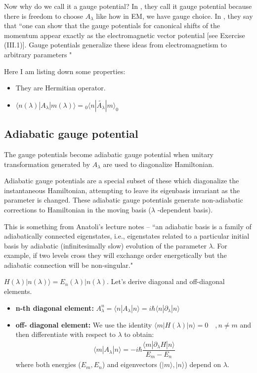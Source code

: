 \documentclass[11pt,a4paper]{article}
\begin{document}
Now why do we call it a gauge potential? In \cite{kolodrubetz2016geometry}, they call it gauge potential because there is freedom to choose $ A_{\lambda}$ like how in EM, we have gauge choice. In \cite{kolodrubetz2016geometry}, they say that
``one can show that the gauge potentials for canonical shifts of the momentum appear exactly as the electromagnetic vector potential [see Exercise (III.1)]. Gauge potentials generalize these ideas from electromagnetism to arbitrary parameters "

 Here I am listing down some properties:
\begin{itemize}
\item They are Hermitian operator.\
\item $\langle n (\lambda)| A_{\lambda}| m(\lambda) \rangle = {}_0\langle  n| \tilde{A_{\lambda}}| m \rangle_0$
\end{itemize}
 

\subsection{Adiabatic gauge potential}
The gauge potentials become adiabatic gauge potential when unitary transformation generated by $A_{\lambda}$ are used to diagonalize Hamiltonian.

 Adiabatic gauge potentials are a special subset of these which diagonalize  the instantaneous Hamiltonian, attempting to leave its eigenbasis invariant as the parameter is changed. These adiabatic gauge potentials generate non-adiabatic corrections to Hamiltonian in the moving basis ($\lambda$ -dependent basis).
 
 This is something from Anatoli's lecture notes \cite{kolodrubetz2016geometry}--
``an adiabatic basis is a family of adiabatically connected eigenstates, i.e., eigenstates related
to a particular initial basis by adiabatic (infinitesimally slow) evolution of the parameter $\lambda$. For example, if two levels cross they will exchange order energetically but the adiabatic connection will be non-singular."


$H (\lambda) |n(\lambda) \rangle = E_n (\lambda) |n(\lambda) $. Let's derive diagonal and off-diagonal elements. 

\begin{itemize}
\item \textbf{n-th diagonal element:} $A_{\lambda}^n= \langle n |A_{\lambda} | n \rangle=  i \hbar\langle n |\partial_{\lambda} | n \rangle $
\item \textbf{off- diagonal element:} We use the identity $\langle m |H(\lambda) | n \rangle=0 \quad, n \neq m$ and then differentiate with respect to $\lambda$ to obtain:
\begin{align}
\boxed{\langle m |A_{\lambda} | n \rangle =  -i \hbar \dfrac{\langle m |\partial_{\lambda}H | n \rangle}{E_m-E_n}}
\end{align}
where both  energies ($E_m, E_n$) and eigenvectors ($|m \rangle, |n \rangle$) depend on $\lambda$.
\end{itemize}
\end{document}
